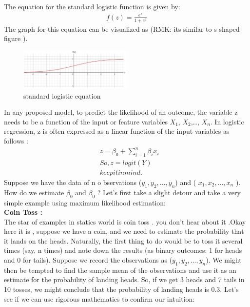 The equation for the standard logistic function is given by:
\begin{align*}
    f(z) = \frac{e^z}{1+e^z}
\end{align*}
The graph for this equation can be visualized as (\small{RMK: its similar to s-shaped figure} ).
\begin{figure}[ht]
    \centering
    \includegraphics[width=0.5\textwidth]{assets/s-shaped2.jpg}
    \caption{ standard logistic equation } 
    \label{fig:my_label}
\end{figure}
In any proposed model, to predict the likelihood of an outcome, the variable z needs to be a function of the input or feature variables $X_1$, $X_2$,…, $X_n$. In logistic regression, z is often expressed as a linear function of the input variables as follows :
\begin{align*}
    &z  = {\beta_0 + \sum_{i=1}^n \beta_i x_i }\\
    &So, z = logit(Y) \\
    &keep it in mind .
\end{align*}
Suppose we have the data of n o    bservations ($y_1, y_2, …, y_n$) and ( $ x_1,x_2, …, x_n $ ). How do we estimate $\beta_0$ and $\beta_0$ ? Let’s first take a slight detour and take a very simple example using maximum likelihood estimation:\\
\textbf{\Large Coin Toss :}\\
The star of examples in statics world is coin toss . you don't hear about it .Okay here it is , suppose we have a coin, and we need to estimate the probability that it lands on the heads. Naturally, the first thing to do would be to toss it several times (say, n times) and note down the results (as binary outcomes: 1 for heads and 0 for tails). Suppose we record the observations as ($y_1, y_2, …, y_n$). We might then be tempted to find the sample mean of the observations and use it as an estimate for the probability of landing heads. So, if we get 3 heads and 7 tails in 10 tosses, we might conclude that the probability of landing heads is 0.3. Let’s see if we can use rigorous mathematics to confirm our intuition:

